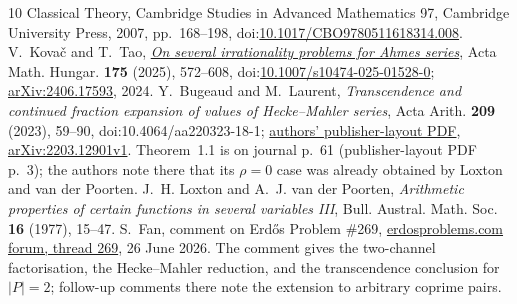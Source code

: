 \documentclass[11pt]{article}
\begin{document}
\begin{thebibliography}{10}
{  Classical Theory}, Cambridge Studies in Advanced Mathematics 97,
  Cambridge University Press, 2007, pp.~168--198,
  doi:\href{https://doi.org/10.1017/CBO9780511618314.008}
  {10.1017/CBO9780511618314.008}.
 V.~Kova\v{c} and T.~Tao,
  \href{https://doi.org/10.1007/s10474-025-01528-0}
  {\emph{On several irrationality problems for Ahmes series}},
  Acta Math. Hungar. \textbf{175} (2025), 572--608,
  doi:\href{https://doi.org/10.1007/s10474-025-01528-0}
  {10.1007/s10474-025-01528-0};
  \href{https://arxiv.org/abs/2406.17593}{arXiv:2406.17593}, 2024.
 Y.~Bugeaud and M.~Laurent,
  \emph{Transcendence and continued fraction expansion of values of
  Hecke--Mahler series}, Acta Arith. \textbf{209} (2023), 59--90,
  doi:10.4064/aa220323-18-1;
  \href{https://irma.math.unistra.fr/~bugeaud/travaux/BuMLAA.pdf}
  {authors' publisher-layout PDF},
  \href{https://arxiv.org/abs/2203.12901}{arXiv:2203.12901v1}.
  Theorem~1.1 is on journal p.~61 (publisher-layout PDF p.~3); the authors
  note there that its $\rho=0$ case was already obtained by Loxton and van
  der Poorten.
 J.~H. Loxton and A.~J. van der Poorten,
  \emph{Arithmetic properties of certain functions in several variables III},
  Bull. Austral. Math. Soc. \textbf{16} (1977), 15--47.
 S.~Fan, comment on Erd\H{o}s Problem \#269,
  \href{https://www.erdosproblems.com/forum/thread/269}
  {erdosproblems.com forum, thread 269}, 26 June 2026.  The comment gives the
  two-channel factorisation, the Hecke--Mahler reduction, and the
  transcendence conclusion for $|P|=2$; follow-up comments there note the
  extension to arbitrary coprime pairs.
\end{thebibliography}
\end{document}
